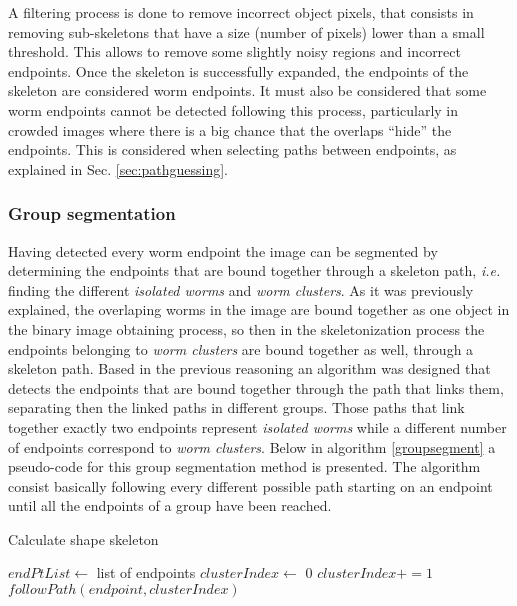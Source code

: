 A filtering process is done to remove incorrect object pixels, that consists in
removing sub-skeletons that have a size (number of pixels) lower than a small 
threshold. This allows to remove some slightly noisy regions and incorrect endpoints.
Once the skeleton is successfully expanded, the endpoints of the skeleton are considered
worm endpoints. 
It must also be considered that some worm endpoints cannot be detected following this 
process, particularly in crowded images where there is a big chance that the
overlaps ``hide'' the endpoints. This is considered when selecting paths between 
endpoints, as explained in Sec. \ref{sec:pathguessing}.



\subsubsection*{Group segmentation}

Having detected every worm endpoint the image can be segmented by determining
the endpoints that are bound together through a skeleton path, \emph{i.e.} finding 
the different \emph{isolated worms} and \emph{worm clusters}.
As it was previously explained, the overlaping worms in the image are bound together
as one object in the binary image obtaining process, so then in the skeletonization
process the endpoints belonging to \emph{worm clusters} are bound together as well,
through a skeleton path.
Based in the previous reasoning an algorithm was designed that detects the endpoints 
that are bound together through the path that links them, separating then the 
linked paths in different groups. Those paths that link together exactly two
endpoints represent \emph{isolated worms} while a different number of endpoints
correspond to \emph{worm clusters}.
Below in algorithm \ref{groupsegment} a pseudo-code for this group segmentation 
method is presented. The algorithm consist basically following every different
possible path starting on an endpoint until all the endpoints of a group have been 
reached. 

\begin{algorithm}                     
\caption{Calculate shape skeleton}         
\label{groupsegment}                    
\begin{algorithmic}                   

\STATE $endPtList \leftarrow$ list of endpoints
\STATE $clusterIndex \leftarrow$ 0
\STATE {}
\ELSE
\STATE $clusterIndex +=1$
\STATE $followPath(endpoint,clusterIndex)$
\ENDIF
\ENDFOR
\end{algorithmic}
\end{algorithm}

